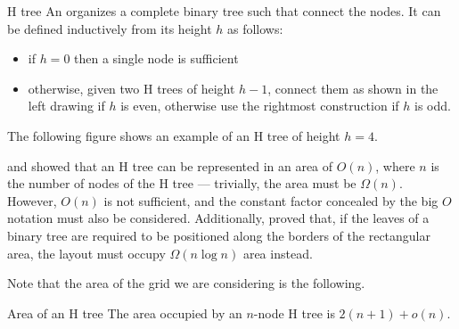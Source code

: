 \documentclass[a4paper, 12pt]{report}
\begin{document}
    \begin{frameddefn}{H tree}
        An  organizes a complete binary tree such that  connect the nodes. It can be defined inductively from its height $h$ as follows:
        \begin{itemize}
            \item if $h = 0$ then a single node is sufficient
            \item otherwise, given two H trees of height $h - 1$, connect them as shown in the left drawing if $h$ is even, otherwise use the rightmost construction if $h$ is odd.
        \end{itemize}
    \end{frameddefn}

    \begin{example}[H trees]
        The following figure shows an example of an H tree of height $h = 4$.

    \end{example}

    \textcite{leiserson} and \textcite{valiant} showed that an H tree can be represented in an area of $O(n)$, where $n$ is the number of nodes of the H tree --- trivially, the area must be $\Omega(n)$. However, $O(n)$ is not sufficient, and the constant factor concealed by the big $O$ notation must also be considered. Additionally, \textcite{brent} proved that, if the leaves of a binary tree are required to be positioned along the borders of the rectangular area, the layout must occupy $\Omega (n \log n)$ area instead.

    Note that the area of the grid we are considering is the following.


    \begin{framedthm}{Area of an H tree}
        The area occupied by an $n$-node H tree is $2(n + 1) + o(n)$.
    \end{framedthm}
\end{document}
